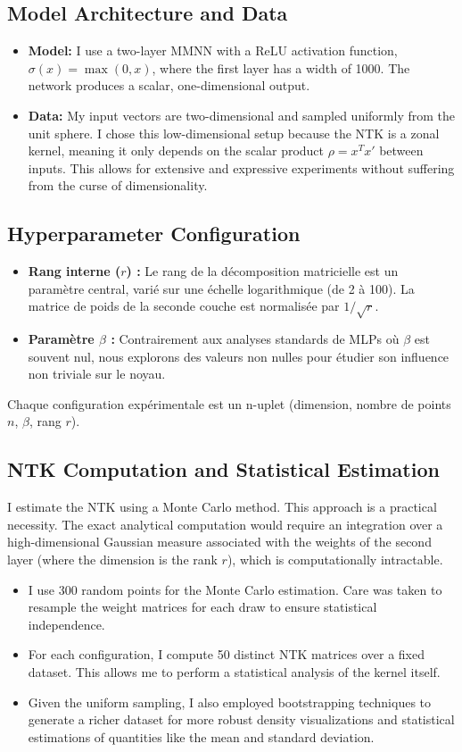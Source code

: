 \documentclass[12pt]{article}
\begin{document}
\subsection{Model Architecture and Data}
\begin{itemize}
    \item \textbf{Model:} I use a two-layer MMNN with a ReLU activation function, $\sigma(x) = \max(0, x)$, where the first layer has a width of 1000. The network produces a scalar, one-dimensional output.
    \item \textbf{Data:} My input vectors are two-dimensional and sampled uniformly from the unit sphere. I chose this low-dimensional setup because the NTK is a zonal kernel, meaning it only depends on the scalar product $\rho = x^T x'$ between inputs. This allows for extensive and expressive experiments without suffering from the curse of dimensionality.
\end{itemize}

\subsection{Hyperparameter Configuration}
\begin{itemize}
    \item \textbf{Rang interne ($r$) :} Le rang de la décomposition matricielle est un paramètre central, varié sur une échelle logarithmique (de 2 à 100). La matrice de poids de la seconde couche est normalisée par $1/\sqrt{r}$.
    \item \textbf{Paramètre $\beta$ :} Contrairement aux analyses standards de MLPs où $\beta$ est souvent nul, nous explorons des valeurs non nulles pour étudier son influence non triviale sur le noyau.
\end{itemize}
Chaque configuration expérimentale est un n-uplet (dimension, nombre de points $n$, $\beta$, rang $r$).

\subsection{NTK Computation and Statistical Estimation}
I estimate the NTK using a Monte Carlo method. This approach is a practical necessity. The exact analytical computation would require an integration over a high-dimensional Gaussian measure associated with the weights of the second layer (where the dimension is the rank $r$), which is computationally intractable.
\begin{itemize}
    \item I use 300 random points for the Monte Carlo estimation. Care was taken to resample the weight matrices for each draw to ensure statistical independence.
    \item For each configuration, I compute 50 distinct NTK matrices over a fixed dataset. This allows me to perform a statistical analysis of the kernel itself.
    \item Given the uniform sampling, I also employed bootstrapping techniques to generate a richer dataset for more robust density visualizations and statistical estimations of quantities like the mean and standard deviation.
\end{itemize}
\end{document}
